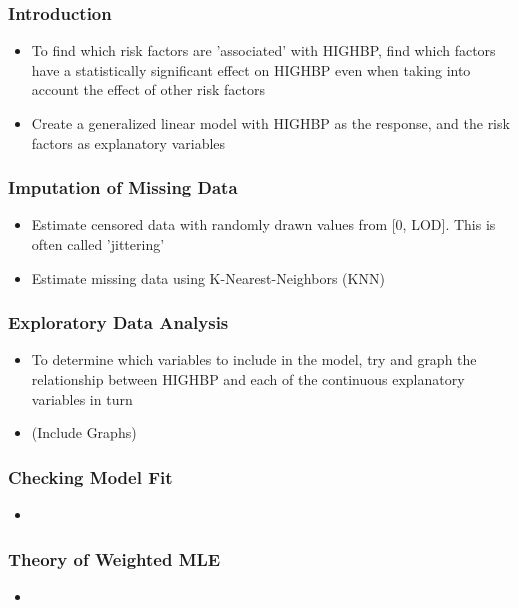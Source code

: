 \documentclass{beamer}
\begin{document}
\frame
{
  \frametitle{Introduction}

\begin{itemize}
\item
To find which risk factors are 'associated' with HIGHBP, find which factors have a statistically significant effect on HIGHBP even when taking into account the effect of other risk factors
\item
Create a generalized linear model with HIGHBP as the response, and the risk factors as explanatory variables

\end{itemize} 

}


\frame
{
  \frametitle{Imputation of Missing Data}

\begin{itemize}
\item
Estimate censored data with randomly drawn values from [0, LOD]. This is often called 'jittering'
\item
Estimate missing data using K-Nearest-Neighbors (KNN)

  
\end{itemize} 

}


\frame
{
  \frametitle{Exploratory Data Analysis}

\begin{itemize}
\item
To determine which variables to include in the model, try and graph the relationship between HIGHBP and each of the continuous explanatory variables in turn
\item
(Include Graphs)

  
\end{itemize} 

}


\frame
{
  \frametitle{Checking Model Fit}

\begin{itemize}
\item

  
\end{itemize} 

}


\frame
{
  \frametitle{Theory of Weighted MLE}

\begin{itemize}
\item

  
\end{itemize} 

}
\end{document}
